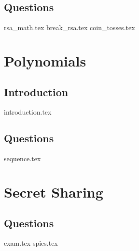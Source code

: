 \documentclass{exam}
\begin{document}
\subsection{Questions}
\begin{questions}
{rsa_math.tex}
{break_rsa.tex}
{coin_tosses.tex}
\end{questions}

\section{Polynomials}
\subsection{Introduction}
{introduction.tex}
\subsection{Questions}
\begin{questions}
{sequence.tex}
\end{questions}

\section{Secret Sharing}
\subsection{Questions}
\begin{questions}
{exam.tex}
{spies.tex}
\end{questions}
\end{document}
